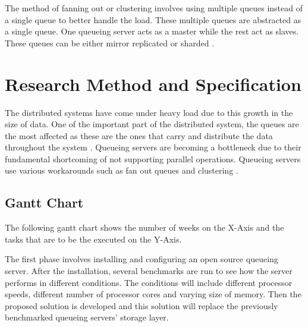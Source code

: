 \documentclass[12pt,a4paper]{article}
\begin{document}
 The method of fanning out or clustering involves using multiple queues instead of a single queue to better handle the load. These multiple queues are abstracted as a single queue. One queueing server acts as a master while the rest act as slaves. These queues can be either mirror replicated or sharded \citep{albrecht2013making}.

\section{Research Method and Specification}

 The distributed systems have come under heavy load due to this growth in the size of data. One of the important part of the distributed system, the queues are the most affected as these are the ones that carry and distribute the data throughout the system \citep{lamport1978time}. Queueing servers are becoming a bottleneck due to their fundamental shortcoming of not supporting parallel operations. Queueing servers use various workarounds such as fan out queues and clustering \citep{albrecht2013making}.
 
 \subsection{Gantt Chart}
 
 The following gantt chart shows the number of weeks on the X-Axis and the tasks that are to be the executed on the Y-Axis.
 
 \begin{gantt}{10}{12}
 \begin{ganttitle}
 \end{ganttitle}
 \end{gantt}

 \bigskip
 The first phase involves installing and configuring an open source queueing server. After the installation, several benchmarks are run to see how the server performs in different conditions. The conditions will include different processor speeds, different number of processor cores and varying size of memory. Then the proposed solution is developed and this solution will replace the previously benchmarked queueing servers' storage layer.
 



\end{document}
